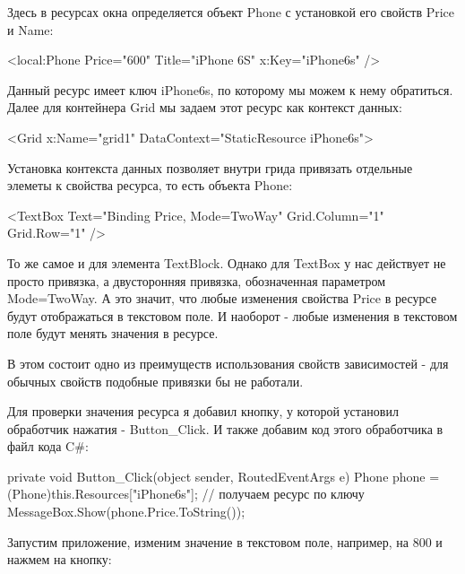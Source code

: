 Здесь в ресурсах окна определяется объект Phone с установкой его свойств Price и Name:

	
<local:Phone Price="600" Title="iPhone 6S" x:Key="iPhone6s" />

Данный ресурс имеет ключ iPhone6s, по которому мы можем к нему обратиться. Далее для контейнера Grid мы задаем этот ресурс как контекст данных:

<Grid x:Name="grid1" DataContext="{StaticResource iPhone6s}">

Установка контекста данных позволяет внутри грида привязать отдельные элеметы к свойства ресурса, то есть объекта Phone:

<TextBox Text="{Binding Price, Mode=TwoWay}" Grid.Column="1" Grid.Row="1"  />


То же самое и для элемента TextBlock. Однако для TextBox у нас действует не просто привязка, а двусторонняя привязка, обозначенная параметром Mode=TwoWay. А это значит, что любые изменения свойства Price в ресурсе будут отображаться в текстовом поле. И наоборот - любые изменения в текстовом поле будут менять значения в ресурсе.

В этом состоит одно из преимуществ использования свойств зависимостей - для обычных свойств подобные привязки бы не работали.

Для проверки значения ресурса я добавил кнопку, у которой установил обработчик нажатия - Button_Click. И также добавим код этого обработчика в файл кода C#:

private void Button_Click(object sender, RoutedEventArgs e)
{
    Phone phone = (Phone)this.Resources["iPhone6s"]; // получаем ресурс по ключу
    MessageBox.Show(phone.Price.ToString());
}

Запустим приложение, изменим значение в текстовом поле, например, на 800 и нажмем на кнопку:


